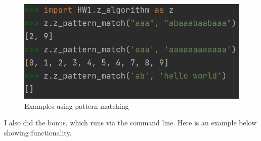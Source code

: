 \documentclass[11pt]{article}
\begin{document}
\begin{figure}[h]
    \centering
    \includegraphics[]{example2.png}
    \caption{Examples using pattern matching}
    \label{fig:z_alg}
\end{figure}

I also did the bonus, which runs via the command line. Here is an example below showing functionality.
\end{document}
